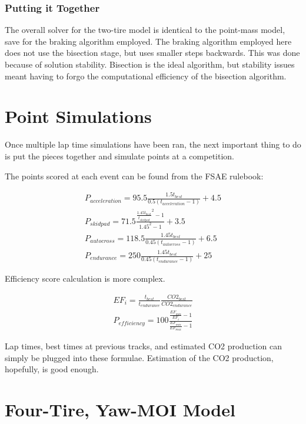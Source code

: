 \documentclass{article}
\begin{document}
\subsubsection{Putting it Together}

The overall solver for the two-tire model is identical to the point-mass model, save for the braking algorithm employed. The braking algorithm employed here does not use the bisection stage, but uses smaller steps backwards. This was done because of solution stability. Bisection is the ideal algorithm, but stability issues meant having to forgo the computational efficiency of the bisection algorithm.

\section{Point Simulations}

Once multiple lap time simulations have been ran, the next important thing to do is put the pieces together and simulate points at a competition.

The points scored at each event can be found from the FSAE rulebook:

\begin{align}
	P_{acceleration} = 95.5 \frac{1.5 t_{best}}{0.5 (t_{acceleration} - 1)} + 4.5 \\
	P_{skidpad} = 71.5 \frac{\frac{1.45 t_{best}}{t_{skidpad}}^2 -1}{1.45^2 - 1} + 3.5 \\
	P_{autocross} = 118.5 \frac{1.45 t_{best}}{0.45 (t_{autocross} - 1)} + 6.5 \\
	P_{endurance} = 250 \frac{1.45 t_{best}}{0.45 (t_{endurance} - 1)} + 25
\end{align}

Efficiency score calculation is more complex.

\begin{align}
	EF_i = \frac{t_{best}}{t_{endurance}} \frac{CO2_{best}}{CO2_{endurance}} \\
	P_{efficiency} = 100 \frac{\frac{EF_{min}}{EF_i}-1}{\frac{EF_{min}}{EF_{max}}-1}
\end{align}

Lap times, best times at previous tracks, and estimated CO2 production can simply be plugged into these formulae. Estimation of the CO2 production, hopefully, is good enough.

\section{Four-Tire, Yaw-MOI Model}
\end{document}
